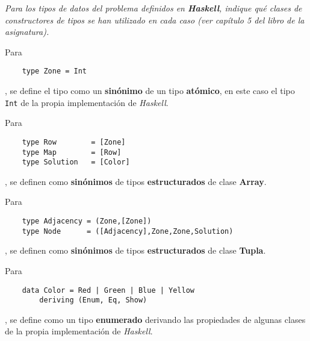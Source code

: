 \documentclass[a4paper, 12pt]{article}
\begin{document}
        \textit{Para los tipos de datos del problema definidos en 
        \textbf{Haskell}, indique qué clases de constructores de tipos se han 
        utilizado en cada caso (ver capítulo 5 del libro de la asignatura).}
        \\\mbox{}

        Para
        \begin{verbatim}
    type Zone = Int
        \end{verbatim}
        , se define el tipo como un \textbf{sinónimo} de un tipo 
        \textbf{atómico}, en este caso el tipo \texttt{Int} de la 
        propia implementación de \textit{Haskell}.\\\mbox{}

        Para
        \begin{verbatim}
    type Row        = [Zone]
    type Map        = [Row]
    type Solution   = [Color]
        \end{verbatim}
        , se definen como \textbf{sinónimos} de tipos \textbf{estructurados} 
        de clase \textbf{Array}. \\\mbox{}

        Para
        \begin{verbatim}
    type Adjacency = (Zone,[Zone])
    type Node      = ([Adjacency],Zone,Zone,Solution)
        \end{verbatim}
        , se definen como \textbf{sinónimos} de tipos \textbf{estructurados} 
        de clase \textbf{Tupla}. \\\mbox{}

        Para 
        \begin{verbatim}
    data Color = Red | Green | Blue | Yellow
        deriving (Enum, Eq, Show)
        \end{verbatim}
        , se define como un tipo \textbf{enumerado} derivando las propiedades de 
        algunas clases de la propia implementación de \textit{Haskell}.
\end{document}
